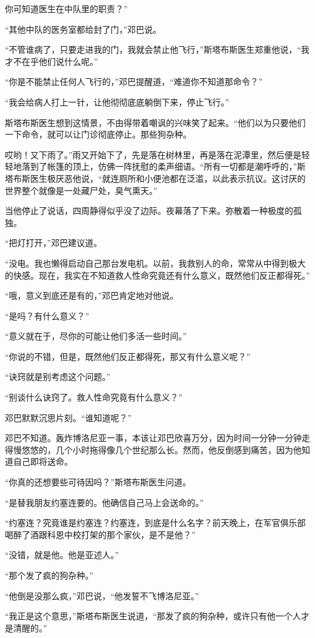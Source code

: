     你可知道医生在中队里的职责？”

    “其他中队的医务室都给封了门，”邓巴说。

    “不管谁病了，只要走进我的门，我就会禁止他飞行，”斯塔布斯医生郑重他说，“我才不在乎他们说什么呢。”

    “你是不能禁止任何人飞行的，”邓巴提醒道，“难道你不知道那命令？”

    “我会给病人打上一针，让他彻彻底底躺倒下来，停止飞行。”

    斯塔布斯医生想到这情景，不由得带着嘲讽的兴味笑了起来。“他们以为只要他们一下命令，就可以让门诊彻底停止。那些狗杂种。

    哎哟！又下雨了。”雨又开始下了，先是落在树林里，再是落在泥潭里，然后便是轻轻地落到了帐篷的顶上，仿佛一阵抚慰的柔声细语。“所有一切都是潮呼呼的，”斯塔布斯医生极厌恶他说，“就连厕所和小便池都在泛滥，以此表示抗议。这讨厌的世界整个就像是一处藏尸处，臭气熏天。”

    当他停止了说话，四周静得似乎没了边际。夜幕落了下来。弥散着一种极度的孤独。

    “把灯打开，”邓巴建议道。

    “没电。我也懒得启动自己那台发电机。以前，我救别人的命，常常从中得到极大的快感。现在，我实在不知道救人性命究竟还有什么意义，既然他们反正都得死。”

    “哦，意义到底还是有的，”邓巴肯定地对他说。

    “是吗？有什么意义？”

    “意义就在于，尽你的可能让他们多活一些时间。”

    “你说的不错，但是，既然他们反正都得死，那又有什么意义呢？”

    “诀窍就是别考虑这个问题。”

    “别谈什么诀窍了。救人性命究竟有什么意义？”

    邓巴默默沉思片刻。“谁知道呢？”

    邓巴不知道。轰炸博洛尼亚一事，本该让邓巴欣喜万分，因为时间一分钟一分钟走得慢悠悠的，几个小时拖得像几个世纪那么长。然而，他反倒感到痛苦，因为他知道自己即将送命。

    “你真的还想要些可待因吗？”斯塔布斯医生问道。

    “是替我朋友约塞连要的。他确信自己马上会送命的。”

    “约塞连？究竟谁是约塞连？约塞连，到底是什么名字？前天晚上，在军官俱乐部喝醉了酒跟科恩中校打架的那个家伙，是不是他？”

    “没错，就是他。他是亚述人。”

    “那个发了疯的狗杂种。”

    “他倒是没那么疯，”邓巴说，“他发誓不飞博洛尼亚。”

    “我正是这个意思，”斯塔布斯医生说道，“那发了疯的狗杂种，或许只有他一个人才是清醒的。”
